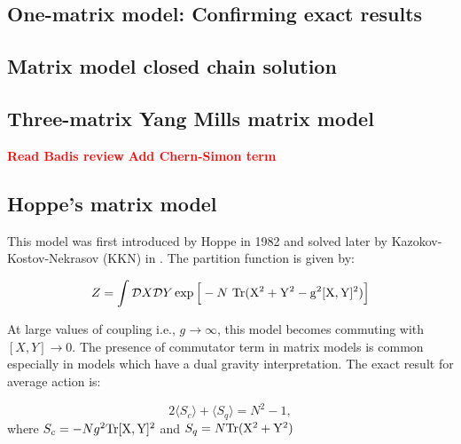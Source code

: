 \documentclass[11pt]{article}
\newcommand{\TODO}[1]{\textcolor{red}{{\bf #1}}}
\begin{document}
\subsection{One-matrix model: Confirming exact results} 
\subsection{Matrix model closed chain solution} 
\subsection{Three-matrix Yang Mills matrix model}

\TODO{Read Badis review} 
\TODO{Add Chern-Simon term}



\subsection{Hoppe's matrix model}

This model was first introduced by Hoppe in 1982 and solved later by 
Kazokov-Kostov-Nekrasov (KKN) in \cite{Kazakov:1998ji}. The partition function is given by:

\begin{equation}
Z = \int \mathcal{D}X \mathcal{D}Y \exp \Big[-N ~ \rm{Tr} (X^2 + Y^2 - g^2 [X,Y]^2) \Big] 
\end{equation}

At large values of coupling i.e., $ g \to \infty$, this model becomes commuting with 
$ [X,Y] \to 0$. The presence of commutator term in matrix models is common especially in models which have a dual gravity interpretation. 
The exact result for average action is:

\begin{equation}
	2 \langle S_{c} \rangle + \langle S_{q}  \rangle = N^2 - 1, 
\end{equation}
where $ S_{c} = -Ng^2 \rm{Tr}[X,Y]^2$  and 
$ S_{q} = N \rm{Tr} (X^2 + Y^2) $
\end{document}
